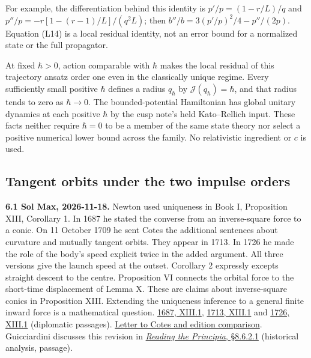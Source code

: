 \documentclass[11pt,a4paper]{article}
\begin{document}
For example, the differentiation behind this identity is
\(p'/p=(1-r/L)/q\) and \(p''/p=-r[1-(r-1)/L]/(q^2L)\); then
\(b''/b=3(p'/p)^2/4-p''/(2p)\). Equation (L14) is a local residual
identity, not an error bound for a normalized state or the full
propagator.

At fixed \(\hbar>0\), action comparable with \(\hbar\) makes the local
residual of this trajectory ansatz order one even in the classically
unique regime. Every sufficiently small positive \(\hbar\) defines a
radius \(q_\hbar\) by \(\mathcal J(q_\hbar)=\hbar\), and that radius
tends to zero as \(\hbar\to0\). The bounded-potential Hamiltonian has
global unitary dynamics at each positive \(\hbar\) by the cusp note's
held Kato--Rellich input. These facts neither require \(\hbar=0\) to be
a member of the same state theory nor select a positive numerical lower
bound across the family. No relativistic ingredient or \(c\) is used.

\subsection{Tangent orbits under the two impulse
orders}\label{tangent-orbits-under-the-two-impulse-orders}

\textbf{6.1 Sol Max, 2026-11-18.} Newton used uniqueness in Book I,
Proposition XIII, Corollary 1. In 1687 he stated the converse from an
inverse-square force to a conic. On 11 October 1709 he sent Cotes the
additional sentences about curvature and mutually tangent orbits. They
appear in 1713. In 1726 he made the role of the body's speed explicit
twice in the added argument. All three versions give the launch speed at
the outset. Corollary 2 expressly excepts straight descent to the
centre. Proposition VI connects the orbital force to the short-time
displacement of Lemma X. These are claims about inverse-square conics in
Proposition XIII. Extending the uniqueness inference to a general finite
inward force is a mathematical question.
\href{https://www.newtonproject.ox.ac.uk/view/texts/diplomatic/NATP00077\#par109}{1687,
XIII.1},
\href{https://www.newtonproject.ox.ac.uk/view/texts/diplomatic/NATP00082\#par140}{1713,
XIII.1} and
\href{https://www.newtonproject.ox.ac.uk/view/texts/diplomatic/NATP00087\#par130}{1726,
XIII.1} (diplomatic passages).
\href{../docs/Newton_Principia_Motte1846.md\#corollary-1-to-proposition-xiii}{Letter
to Cotes and edition comparison}. Guicciardini discusses this revision
in \href{https://doi.org/10.1017/CBO9780511524752}{\emph{Reading the
Principia}, §8.6.2.1} (historical analysis, passage).
\end{document}

